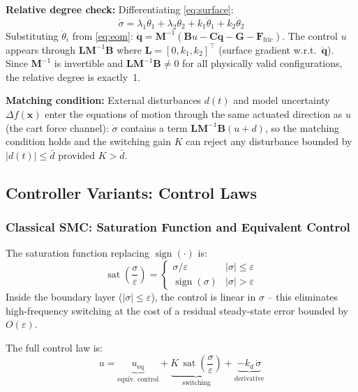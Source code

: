 \documentclass[11pt, a4paper]{article}
\newcommand{\vx}{\boldsymbol{x}}
\newcommand{\vq}{\boldsymbol{q}}
\newcommand{\sign}{\operatorname{sign}}
\newcommand{\sat}{\operatorname{sat}}
\begin{document}
\textbf{Relative degree check:} Differentiating \eqref{eq:surface}:
\begin{equation}
  \dot{\sigma} = \lambda_1\dot{\theta}_1 + \lambda_2\dot{\theta}_2
               + k_1\ddot{\theta}_1 + k_2\ddot{\theta}_2
\end{equation}
Substituting $\ddot{\theta}_i$ from \eqref{eq:eom}:
$\ddot{\vq} = \mathbf{M}^{-1}(\mathbf{B}u - \mathbf{C}\dot{\vq} - \mathbf{G} - \mathbf{F}_\text{fric})$.
The control $u$ appears through $\mathbf{L}\mathbf{M}^{-1}\mathbf{B}$ where
$\mathbf{L} = [0, k_1, k_2]^\top$ (surface gradient w.r.t.\ $\ddot{\vq}$).
Since $\mathbf{M}^{-1}$ is invertible and $\mathbf{L}\mathbf{M}^{-1}\mathbf{B} \neq 0$
for all physically valid configurations, the relative degree is exactly~1.

\textbf{Matching condition:} External disturbances $d(t)$ and model
uncertainty $\Delta f(\vx)$ enter the equations of motion through the
same actuated direction as $u$ (the cart force channel):
$\dot{\sigma}$ contains a term $\mathbf{L}\mathbf{M}^{-1}\mathbf{B}(u + d)$,
so the matching condition holds and the switching gain $K$ can reject any
disturbance bounded by $|d(t)| \leq \bar{d}$ provided $K > \bar{d}$.

\subsection{Controller Variants: Control Laws}

\subsubsection{Classical SMC: Saturation Function and Equivalent Control}

The saturation function replacing $\sign(\cdot)$ is:
\begin{equation}
  \sat\!\left(\frac{\sigma}{\varepsilon}\right) =
  \begin{cases}
    \sigma/\varepsilon & |\sigma| \leq \varepsilon \\
    \sign(\sigma)      & |\sigma| > \varepsilon
  \end{cases}
  \label{eq:sat}
\end{equation}
Inside the boundary layer ($|\sigma| \leq \varepsilon$), the control is
linear in $\sigma$ -- this eliminates high-frequency switching at the
cost of a residual steady-state error bounded by $O(\varepsilon)$.

The full control law is:
\begin{equation}
  u = \underbrace{u_\text{eq}}_{\text{equiv.\ control}}
    + \underbrace{K\,\sat\!\left(\frac{\sigma}{\varepsilon}\right)}_{\text{switching}}
    + \underbrace{-k_d\,\dot{\sigma}}_{\text{derivative}}
  \label{eq:classical}
\end{equation}
\end{document}
